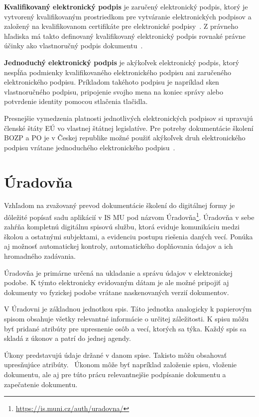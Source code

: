 \documentclass[
  digital,     %
  oneside,     %
  nosansbold,  %
  nocolorbold, %
  lof,         %
  nolot,         %
]{fithesis4}
\begin{document}
\textbf{Kvalifikovaný elektronický podpis} je zaručený elektronický podpis, ktorý je vytvorený kvalifikovaným prostriedkom pre vytváranie elektronických podpisov a založený na kvalifikovanom certifikáte pre elektronické podpisy~\cite[čl.~3,~odst.~12]{eidas2024}. Z právneho hľadiska má takto definovaný kvalifikovaný elektronický podpis rovnaké právne účinky ako vlastnoručný podpis dokumentu~\cite[čl.~25,~odst.~2]{eidas2024}.

\textbf{Jednoduchý elektronický podpis} je akýkoľvek elektronický podpis, ktorý nespĺňa podmienky kvalifikovaného elektronického podpisu ani zaručeného elektronického podpisu. Príkladom takéhoto podpisu je napríklad sken vlastnoručného podpisu, pripojenie svojho mena na koniec správy alebo potvrdenie identity pomocou stlačenia tlačidla.

Presnejšie vymedzenia platnosti jednotlivých elektronických podpisov si upravujú členské štáty EÚ vo vlastnej štátnej legislatíve. Pre potreby dokumentácie školení BOZP a PO je v Českej republike možné použiť akýkoľvek druh elektronického podpisu vrátane jednoduchého elektronického podpisu~\cite[§~7]{cesko_el_podpisy}.


\chapter{Úradovňa}
\label{kap-5}
Vzhľadom na zvažovaný prevod dokumentácie školení do digitálnej formy je dôležité popísať sadu aplikácií v IS MU pod názvom Úradovňa\footnote{\url{https://is.muni.cz/auth/uradovna/}}. Úradovňa v sebe zahŕňa kompletnú digitálnu spisovú službu, ktorá eviduje komunikáciu medzi školou a ostatnými subjektami, a evidenciu postupu riešenia daných vecí. Ponúka aj možnosť automatickej kontroly, automatického doplňovania údajov a ich hromadného zadávania.~\cite{uradovna2024}

Úradovňa je primárne určená na ukladanie a správu údajov v elektronickej podobe. K týmto elektronicky evidovaným dátam je ale možné pripojiť aj dokumenty vo fyzickej podobe vrátane naskenovaných verzií dokumentov.~\cite{uradovna2024}

V Úradovni je základnou jednotkou spis. Táto jednotka analogicky k papierovým spisom obsahuje všetky relevantné informácie o určitej záležitosti. K spisu môžu byť pridané atribúty pre upresnenie osôb a vecí, ktorých sa týka. Každý spis sa skladá z úkonov a patrí do jednej agendy.~\cite{uradovna2024}

Úkony predstavujú údaje držané v danom spise. Takisto môžu obsahovať upresňujúce atribúty.~\cite{uradovna2024} Úkonom môže byť napríklad založenie spisu, vloženie dokumentu, ale aj pre túto prácu relevantnejšie podpísanie dokumentu a zapečatenie dokumentu.
\end{document}
